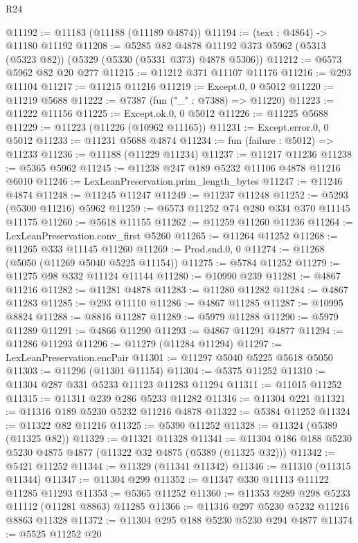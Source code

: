 \begin{lexlean}{R24}
\begin{coremodule}
@11192 := @11183 (@11188 (@11189 @4874))
@11194 := (text : @4864) -> @11180 @11192
@11208 := @5285
    @82
    @4878
    @11192
    @373
    @5962
    (@5313 (@5323 @82))
    (@5329 (@5330 (@5331 @373) @4878 @5306))
@11212 := @6573 @5962 @82 @20 @277
@11215 := @11212 @371 @11107 @11176
@11216 := @293 @11104
@11217 := @11215 @11216
@11219 := Except.{0, 0} @5012
@11220 := @11219 @5688
@11222 := @7387 (fun ("_" : @7388) => @11220)
@11223 := @11222 @11156
@11225 := Except.ok.{0, 0} @5012
@11226 := @11225 @5688
@11229 := @11223 (@11226 (@10962 @11165))
@11231 := Except.error.{0, 0} @5012
@11233 := @11231 @5688 @4874
@11234 := fun (failure : @5012) => @11233
@11236 := @11188 (@11229 @11234)
@11237 := @11217 @11236
@11238 := @5365 @5962
@11245 := @11238 @247 @189 @5232 @11106 @4878 @11216 @6010
@11246 := LexLeanPreservation.prim_length_bytes
@11247 := @11246 @4874
@11248 := @11245 @11247
@11249 := @11237 @11248
@11252 := @5293 (@5300 @11216) @5962
@11259 := @6573 @11252 @74 @280 @334 @370 @11145 @11175
@11260 := @5618 @11155
@11262 := @11259 @11260 @11236
@11264 := LexLeanPreservation.conv_first @5260
@11265 := @11264 @11252
@11268 := @11265 @333 @11145 @11260
@11269 := Prod.snd.{0, 0}
@11274 := @11268 (@5050 (@11269 @5040 @5225 @11154))
@11275 := @5784 @11252
@11279 := @11275 @98 @332 @11124 @11144
@11280 := @10990 @239
@11281 := @4867 @11216
@11282 := @11281 @4878
@11283 := @11280 @11282
@11284 := @4867 @11283
@11285 := @293 @11110
@11286 := @4867 @11285
@11287 := @10995 @8824
@11288 := @8816 @11287
@11289 := @5979 @11288
@11290 := @5979 @11289
@11291 := @4866 @11290
@11293 := @4867 @11291 @4877
@11294 := @11286 @11293
@11296 := @11279 (@11284 @11294)
@11297 := LexLeanPreservation.encPair
@11301 := @11297 @5040 @5225 @5618 @5050
@11303 := @11296 (@11301 @11154)
@11304 := @5375 @11252
@11310 := @11304 @287 @331 @5233 @11123 @11283 @11294
@11311 := @11015 @11252
@11315 := @11311 @239 @286 @5233 @11282
@11316 := @11304 @221
@11321 := @11316 @189 @5230 @5232 @11216 @4878
@11322 := @5384 @11252
@11324 := @11322 @82 @11216
@11325 := @5390 @11252
@11328 := @11324 (@5389 (@11325 @82))
@11329 := @11321 @11328
@11341 := @11304 @186 @188 @5230 @5230 @4875 @4877 (@11322 @32 @4875 (@5389 (@11325 @32)))
@11342 := @5421 @11252
@11344 := @11329 (@11341 @11342)
@11346 := @11310 (@11315 @11344)
@11347 := @11304 @299
@11352 := @11347 @330 @11113 @11122 @11285 @11293
@11353 := @5365 @11252
@11360 := @11353 @289 @298 @5233 @11112 (@11281 @8863) @11285
@11366 := @11316 @297 @5230 @5232 @11216 @8863 @11328
@11372 := @11304 @295 @188 @5230 @5230 @294 @4877
@11374 := @5525 @11252 @20

\end{coremodule}
\end{lexlean}
